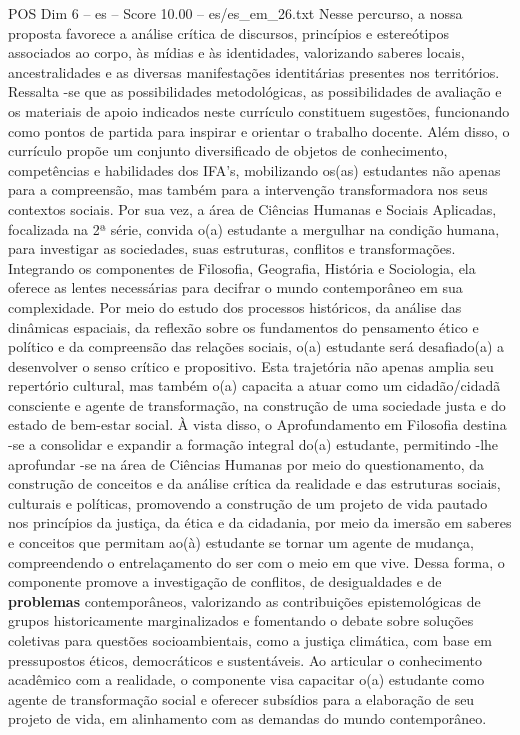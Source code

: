 \begin{textsample}{POS Dim 6 – es – Score 10.00 – es/es\_em\_26.txt}
Nesse percurso, a nossa proposta favorece a análise crítica de discursos, princípios e estereótipos associados ao corpo, às mídias e às identidades, valorizando saberes locais, ancestralidades e as diversas manifestações identitárias presentes nos territórios.
Ressalta -se que as possibilidades metodológicas, as possibilidades de avaliação e os materiais de apoio indicados neste currículo constituem sugestões, funcionando como pontos de partida para inspirar e orientar o trabalho docente.
Além disso, o currículo propõe um conjunto diversificado de objetos de conhecimento, competências e habilidades dos IFA’s, mobilizando os(as) estudantes não apenas para a compreensão, mas também para a intervenção transformadora nos seus contextos sociais.
Por sua vez, a área de Ciências Humanas e Sociais Aplicadas, focalizada na 2ª série, convida o(a) estudante a mergulhar na condição humana, para investigar as sociedades, suas estruturas, conflitos e transformações.
Integrando os componentes de Filosofia, Geografia, História e Sociologia, ela oferece as lentes necessárias para decifrar o mundo contemporâneo em sua complexidade.
Por meio do estudo dos processos históricos, da análise das dinâmicas espaciais, da reflexão sobre os fundamentos do pensamento ético e político e da compreensão das relações sociais, o(a) estudante será desafiado(a) a desenvolver o senso crítico e propositivo.
Esta trajetória não apenas amplia seu repertório cultural, mas também o(a) capacita a atuar como um cidadão/cidadã consciente e agente de transformação, na construção de uma sociedade justa e do estado de bem-estar social.
À vista disso, o Aprofundamento em Filosofia destina -se a consolidar e expandir a formação integral do(a) estudante, permitindo -lhe aprofundar -se na área de Ciências Humanas por meio do questionamento, da construção de conceitos e da análise crítica da realidade e das estruturas sociais, culturais e políticas, promovendo a construção de um projeto de vida pautado nos princípios da justiça, da ética e da cidadania, por meio da imersão em saberes e conceitos que permitam ao(à) estudante se tornar um agente de mudança, compreendendo o entrelaçamento do ser com o meio em que vive.
Dessa forma, o componente promove a investigação de conflitos, de desigualdades e de \textbf{problemas} contemporâneos, valorizando as contribuições epistemológicas de grupos historicamente marginalizados e fomentando o debate sobre soluções coletivas para questões socioambientais, como a justiça climática, com base em pressupostos éticos, democráticos e sustentáveis.
Ao articular o conhecimento acadêmico com a realidade, o componente visa capacitar o(a) estudante como agente de transformação social e oferecer subsídios para a elaboração de seu projeto de vida, em alinhamento com as demandas do mundo contemporâneo.

\end{textsample}
